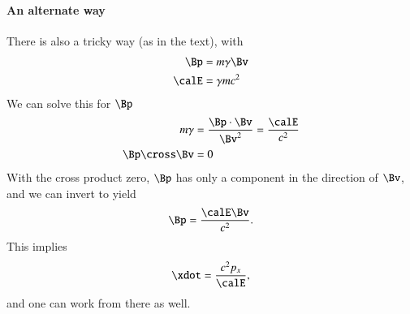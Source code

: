 {\paragraph{An alternate way}
%
There is also a tricky way (as in the text), with
%
\begin{equation}\label{eqn:relativisticElectrodynamicsT3:160}
\begin{aligned}
\Bp &= m \gamma \Bv  \\
\calE &= \gamma m c^2
\end{aligned}
\end{equation}
%
We can solve this for \(\Bp\)
%
\begin{equation}\label{eqn:relativisticElectrodynamicsT3:1010}
\begin{aligned}
m \gamma &= \frac{\Bp \cdot \Bv}{\Bv^2} = \frac{\calE}{c^2} \\
\Bp \cross \Bv &= 0
\end{aligned}
\end{equation}
%
With the cross product zero, \(\Bp\) has only a component in the direction of \(\Bv\), and we can invert to yield
%
\begin{equation}\label{eqn:relativisticElectrodynamicsT3:180}
\Bp = \frac{\calE \Bv}{c^2}.
\end{equation}
%
This implies
%
\begin{equation}\label{eqn:relativisticElectrodynamicsT3:200}
\xdot = \frac{c^2 p_x}{\calE},
\end{equation}
%
and one can work from there as well.

} %
